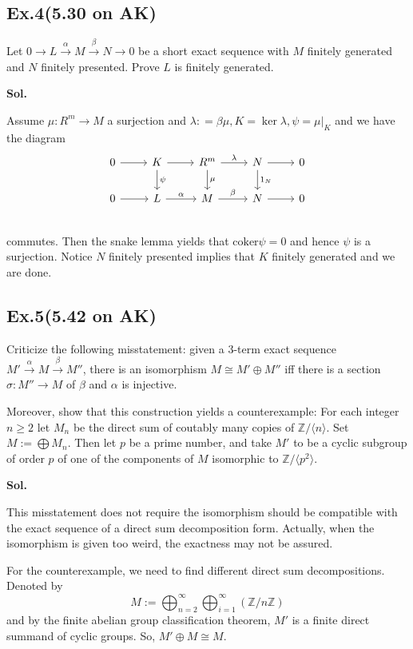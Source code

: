\documentclass[lang=en,11pt,a4paper,citestyle =authoryear]{elegantpaper}
\begin{document}
\subsection*{Ex.4(5.30 on AK)} 
Let $0\to L\overset{\alpha}{\to} M \overset{\beta}{\to} N \to 0$ be a short exact sequence with $M$ finitely generated and $N$ finitely presented. Prove $L$ is finitely generated.\par
\vspace{0.5em}
\textbf{Sol.} \par
Assume $\mu:R^m\to M$ a surjection and $\lambda: = \beta\mu, K = \ker \lambda, \psi = \mu|_K$ and  we have the diagram
\[
\begin{tikzcd}
    0\arrow[r] & K\arrow[r]\arrow[d,"\psi"] & R^m\arrow[r,"\lambda"]\arrow[d,"\mu"] & N\arrow[r]\arrow[d,"1_N"] & 0 \\
    0\arrow[r] & L\arrow[r,"\alpha"] & M\arrow[r,"\beta"] & N\arrow[r] & 0 \\
\end{tikzcd}
\]
commutes. Then the snake lemma yields that $\text{coker}\psi = 0$ and hence $\psi$ is a surjection. Notice $N$ finitely presented implies that $K$ finitely generated and we are done.
\par 
\vspace{0.5em}

\subsection*{Ex.5(5.42 on AK)} 
Criticize the following misstatement: given a $3$-term exact sequence $M'\overset{\alpha}{\to} M \overset{\beta}{\to} M''$, there is an isomorphism $M\cong M'\oplus M''$ iff there is a section $\sigma:M''\to M$ of $\beta$ and $\alpha$ is injective.\par
Moreover, show that this construction yields a counterexample: For each integer $n\geq 2$ let $M_n$ be the direct sum of coutably many copies of $\mathbb{Z}/\langle n\rangle$. Set $M:= \bigoplus M_n$. Then let $p$ be a prime number, and take $M'$ to be a cyclic subgroup of order $p$ of one of the components of $M$ isomorphic to $\mathbb{Z}/\langle p^2\rangle$.
\vspace{0.5em}\par
\textbf{Sol.} \par
This misstatement does not require the isomorphism should be compatible with the exact sequence of a direct sum decomposition form. Actually, when the isomorphism is given too weird, the exactness may not be assured.\par
For the counterexample, we need to find different direct sum decompositions. Denoted by 
\[M:= \bigoplus_{n=2}^\infty\bigoplus_{i=1}^\infty(\mathbb Z/n\mathbb Z)\]
 and by the finite abelian group classification theorem, $M'$ is a finite direct summand of cyclic groups. So, $M'\oplus M\cong M$. 
\end{document}
